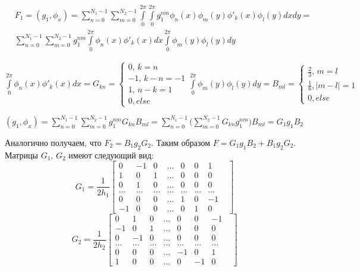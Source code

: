 \documentclass{article}
\begin{document}
\begin{align*}
&F_1 = (g_1, \phi_x) = \sum \limits_{n = 0}^{N_1 - 1} \sum \limits_{m = 0}^{N_2 - 1} \int \limits_0^{2\pi}\int \limits_0^{2\pi} g_1^{nm}\phi_n(x)\phi_m(y) \phi'_k(x) \phi_l(y) dx dy =\\& 
\sum \limits_{n = 0}^{N_1 - 1} \sum \limits_{m = 0}^{N_2 - 1} g_1^{nm} \int \limits_0^{2\pi} \phi_n(x) \phi'_k(x) dx \int \limits_0^{2\pi} \phi_m(y) \phi_l(y) dy
\end{align*}

$\int \limits_0^{2\pi} \phi_n(x) \phi'_k(x) dx  = G_{kn} =
\begin{cases} 
    0, \, k = n \\ 
    -1, \, k - n = -1 \\
    1, \, n - k = 1 \\
    0, else
\end{cases}
\int \limits_0^{2\pi} \phi_m(y) \phi_l(y) dy = B_{ml} =
\begin{cases}
    \frac{2}{3}, \, m = l \\
    \frac{1}{6}, \mid m-l \mid = 1\\
    0, else
\end{cases}$

$(g_1, \phi_x) = \sum \limits_{n = 0}^{N_1 - 1} \sum \limits_{m = 0}^{N_2 - 1} g_1^{nm} G_{kn} B_{ml} = 
\sum \limits_{n = 0}^{N_1 - 1} \big(\sum \limits_{m = 0}^{N_2 - 1} G_{kn} g_1^{nm} \big) B_{ml} = G_1 g_1 B_2
$

Аналогично получаем, что $F_2 = B_1 g_2 G_2$.
Таким образом $F = G_1 g_1 B_2 + B_1 g_2 G_2$.
Матрицы $G_1,\,G_2$ имеют следующий вид:
$$G_1 = \frac{1}{2h_1}
\begin{bmatrix}
0 & -1 & 0 & \ldots & 0 & 0 & 1\\
1 & 0 & 1 & \ldots & 0 & 0 & 0\\
0 & 1 & 0 & \ldots &0 & 0 & 0\\
\ldots & \ldots & \ldots & \ldots & \ldots & \ldots & \ldots &\\
0 & 0 & 0 & \ldots & 1 & 0 & -1\\
-1 & 0 & 0 & \ldots & 0 & 1 & 0
\end{bmatrix}
$$
$$G_2 = \frac{1}{2h_2}
\begin{bmatrix}
0 & 1 & 0 & \ldots & 0 & 0 & -1\\
-1 & 0 & 1 & \ldots & 0 & 0 & 0\\
0 & -1 & 0 & \ldots &0 & 0 & 0\\
\ldots & \ldots & \ldots & \ldots & \ldots & \ldots & \ldots &\\
0 & 0 & 0 & \ldots & -1 & 0 & 1\\
1 & 0 & 0 & \ldots & 0 & -1 & 0
\end{bmatrix}
$$
\end{document}
